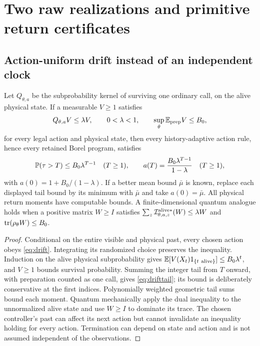 \section{Two raw realizations and primitive return certificates}\label{sec:raw}
\subsection{Action-uniform drift instead of an independent clock}
\begin{proposition}\label{prop:drift}
Let $Q_{\theta,a}$ be the subprobability kernel of surviving one ordinary call, on the alive physical state. If a measurable $V\ge1$ satisfies
\begin{equation}\label{eq:drift}
 Q_{\theta,a}V\le\lambda V,\qquad0<\lambda<1,
 \qquad\sup_\theta\mathbb E_{\rm prep}V\le B_0,
\end{equation}
for every legal action and physical state, then every history-adaptive action rule, hence every retained Borel program, satisfies
\begin{equation}\label{eq:drifttail}
 \mathbb P(\tau>T)\le B_0\lambda^{T-1}\quad(T\ge1),\qquad
 a(T)={B_0\lambda^{T-1}\over1-\lambda}\quad(T\ge1),
\end{equation}
with $a(0)=1+B_0/(1-\lambda)$. If a better mean bound $\bar\mu$ is known, replace each displayed tail bound by its minimum with $\bar\mu$ and take $a(0)=\bar\mu$. All physical return moments have computable bounds. A finite-dimensional quantum analogue holds when a positive matrix $W\ge I$ satisfies
$\sum_z\mathcal I^{\rm alive*}_{\theta,a,z}(W)\le\lambda W$
and $\operatorname{tr}(\rho_\theta W)\le B_0$.
\end{proposition}
\begin{proof}
Conditional on the entire visible and physical past, every chosen action obeys \eqref{eq:drift}. Integrating its randomized choice preserves the inequality. Induction on the alive physical subprobability gives
$\mathbb E[V(X_t)1_{\{t\ {\rm alive}\}}]\le B_0\lambda^t$,
and $V\ge1$ bounds survival probability. Summing the integer tail from $T$ onward, with preparation counted as one call, gives \eqref{eq:drifttail}; its bound is deliberately conservative at the first indices. Polynomially weighted geometric tail sums bound each moment. Quantum mechanically apply the dual inequality to the unnormalized alive state and use $W\ge I$ to dominate its trace. The chosen controller's past can affect its next action but cannot invalidate an inequality holding for every action. Termination can depend on state and action and is not assumed independent of the observations.
\end{proof}

